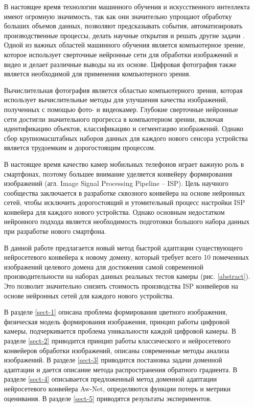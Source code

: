 
В настоящее время технологии машинного обучения и искусственного интеллекта имеют огромную значимость, так как они значительно упрощают обработку больших объемов данных, позволяют предсказывать события, автоматизировать производственные процессы, делать научные открытия и решать другие задачи \cite{lib-sidorenko}. Одной из важных областей машинного обучения является компьютерное зрение, которое использует сверточные нейронные сети для обработки изображений и видео и делает различные выводы на их основе. Цифровая фотография также является необходимой для применения компьютерного зрения.

Вычислительная фотография является областью компьютерного зрения, которая использует вычислительные методы для улучшения качества изображений, полученных с помощью фото- и видеокамер. Глубокие сверточные нейронные сети достигли значительного прогресса в компьютерном зрении, включая идентификацию объектов, классификацию и сегментацию изображений. Однако сбор крупномасштабных наборов данных для каждого нового сенсора устройства является трудоемким и дорогостоящим процессом.

В настоящее время качество камер мобильных телефонов играет важную роль в смартфонах, поэтому большее внимание уделяется конвейеру формирования изображений (агл. Image Signal Processing Pipeline -- ISP). Цель научного сообщества заключается в разработке сквозного конвейера на основе нейронных сетей, чтобы исключить дорогостоящий и утомительный процесс настройки ISP конвейера для каждого нового устройства. Однако основным недостатком нейронного подхода является необходимость подготовки большого набора данных при разработке нового смартфона.


В данной работе предлагается новый метод быстрой адаптации существующего нейросетевого конвейера к новому домену, который требует всего 10 помеченных изображений целевого домена для достижения самой современной производительности на наборах данных реальных тестов камеры (рис. \ref{abstract}). Это позволит значительно снизить стоимость производства ISP конвейеров на основе нейронных сетей для каждого нового устройства.

В разделе \ref{sect-1} описана проблема формирования цветного изображения, физическая модель формирования изображения, принцип работы цифровой камеры, подчеркивается проблема уникальности каждой цифровой камеры. В разделе \ref{sect-2} приводится принцип работы классического и нейросетевого конвейеров обработки изображений, описаны современные методы анализа изображений. В разделе \ref{sect-3} приводится постановка задачи доменной адаптации и дается описание метода распространения обратного градиента. В разделе \ref{sect-4} описывается предложенный метод доменной адаптации нейросетевого конвейера Aw-Net, определяются функции потерь и метрики оценивания. В разделе \ref{sect-5} приводятся результаты экспериментов.

\clearpage